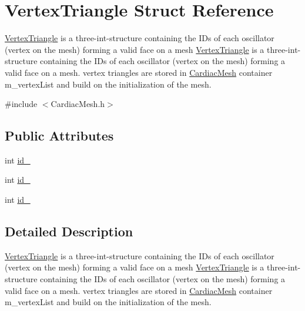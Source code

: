 \hypertarget{struct_vertex_triangle}{\section{Vertex\+Triangle Struct Reference}
\label{struct_vertex_triangle}
}


\hyperlink{struct_vertex_triangle}{Vertex\+Triangle} is a three-\/int-\/structure containing the I\+Ds of each oscillator (vertex on the mesh) forming a valid face on a mesh \hyperlink{struct_vertex_triangle}{Vertex\+Triangle} is a three-\/int-\/structure containing the I\+Ds of each oscillator (vertex on the mesh) forming a valid face on a mesh. vertex triangles are stored in \hyperlink{class_cardiac_mesh}{Cardiac\+Mesh} container m\+\_\+vertex\+List and build on the initialization of the mesh.  




{\ttfamily \#include $<$Cardiac\+Mesh.\+h$>$}

\subsection*{Public Attributes}
\begin{DoxyCompactItemize}
\item 
int \hyperlink{struct_vertex_triangle_a02c83b5bd5c880951ae988a330f66898}{id\+\_}
\item 
int \hyperlink{struct_vertex_triangle_a181c3625c4cae44d95a068dd3005b553}{id\+\_}
\item 
int \hyperlink{struct_vertex_triangle_a4790abaf5729d50fe5ef8b18e3c12654}{id\+\_}
\end{DoxyCompactItemize}


\subsection{Detailed Description}
\hyperlink{struct_vertex_triangle}{Vertex\+Triangle} is a three-\/int-\/structure containing the I\+Ds of each oscillator (vertex on the mesh) forming a valid face on a mesh \hyperlink{struct_vertex_triangle}{Vertex\+Triangle} is a three-\/int-\/structure containing the I\+Ds of each oscillator (vertex on the mesh) forming a valid face on a mesh. vertex triangles are stored in \hyperlink{class_cardiac_mesh}{Cardiac\+Mesh} container m\+\_\+vertex\+List and build on the initialization of the mesh. 

